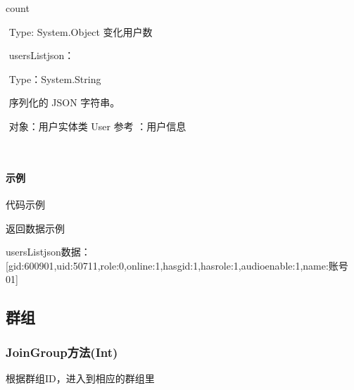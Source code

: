 \documentclass[letterpaper,10pt,english]{sphinxmanual}
\begin{document}
count

​ Type: System.Object 变化用户数

​ usersListjson：

​ Type：System.String

​ 序列化的 JSON 字符串。

​ 对象：用户实体类 User 参考 ：用户信息

​


\paragraph{示例}
\label{\detokenize{csharp_activex:id55}}
代码示例

%
\begin{sphinxVerbatim}[commandchars=\\\{\}]
    

\end{sphinxVerbatim}

返回数据示例

%
\begin{sphinxVerbatim}[commandchars=\\\{\}]
usersListjson数据：
[\PYGZob{}\PYGZdq{}gid\PYGZdq{}:600901,\PYGZdq{}uid\PYGZdq{}:50711,\PYGZdq{}role\PYGZdq{}:0,\PYGZdq{}online\PYGZdq{}:1,\PYGZdq{}has\PYGZus{}gid\PYGZdq{}:1,\PYGZdq{}has\PYGZus{}role\PYGZdq{}:1,\PYGZdq{}audio\PYGZus{}enable\PYGZdq{}:1,\PYGZdq{}name\PYGZdq{}:\PYGZdq{}账号01\PYGZdq{}\PYGZcb{}]
\end{sphinxVerbatim}


\subsection{群组}
\label{\detokenize{csharp_activex:id56}}

\subsubsection{JoinGroup方法(Int)}
\label{\detokenize{csharp_activex:joingroup-int}}
根据群组ID，进入到相应的群组里
\end{document}
